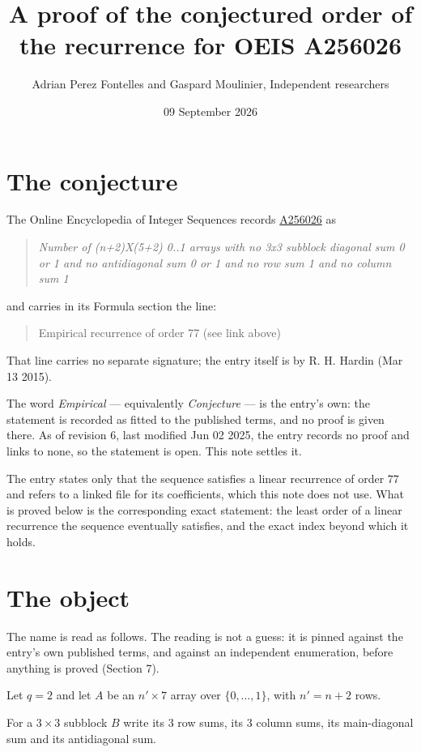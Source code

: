 \documentclass[11pt]{article}
\title{A proof of the conjectured order of the recurrence for OEIS A256026}
\author{Adrian Perez Fontelles and Gaspard Moulinier, Independent researchers}
\date{09 September 2026}
\theoremstyle{definition}
\begin{document}
\maketitle
\section{The conjecture}

The Online Encyclopedia of Integer Sequences records \href{https://oeis.org/A256026}{A256026} as

\begin{quote}\itshape Number of (n+2)X(5+2) 0..1 arrays with no 3x3 subblock diagonal sum 0 or 1 and no antidiagonal sum 0 or 1 and no row sum 1 and no column sum 1\end{quote}

and carries in its Formula section the line:

\begin{quote}\ttfamily Empirical recurrence of order 77 (see link above)\end{quote}

That line carries no separate signature; the entry itself is by R. H. Hardin (Mar 13 2015).

The word {\itshape Empirical} --- equivalently {\itshape Conjecture} --- is the entry's own: the statement is recorded as fitted to the published terms, and no proof is given there. As of revision 6, last modified Jun 02 2025, the entry records no proof and links to none, so the statement is open. This note settles it.

The entry states only that the sequence satisfies a linear recurrence of order $77$ and refers to a linked file for its coefficients, which this note does not use. What is proved below is the corresponding exact statement: the least order of a linear recurrence the sequence eventually satisfies, and the exact index beyond which it holds.

\section{The object}

The name is read as follows. The reading is not a guess: it is pinned against the entry's own published terms, and against an independent enumeration, before anything is proved (Section 7).

Let $q = 2$ and let $A$ be an $n' \times 7$ array over $\{0,\dots,1\}$, with $n' = n + 2$ rows.

For a $3\times3$ subblock $B$ write its 3 row sums, its 3 column sums, its main-diagonal sum and its antidiagonal sum.
\end{document}
